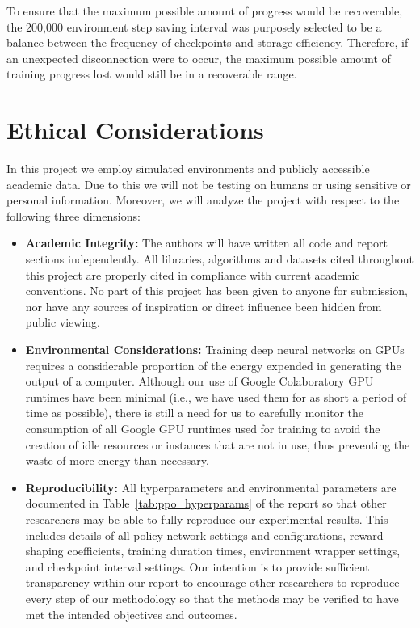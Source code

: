 To ensure that the maximum possible amount of progress would be recoverable, the 200,000 environment step saving interval was purposely selected to be a balance between the frequency of checkpoints and storage efficiency. Therefore, if an unexpected disconnection were to occur, the maximum possible amount of training progress lost would still be in a recoverable range.

\section{Ethical Considerations}
\label{sec:ethics}

In this project we employ simulated environments and publicly accessible academic data. Due to this we will not be testing on humans or using sensitive or personal information. Moreover, we will analyze the project with respect to the following three dimensions:

\begin{itemize}
    \item \textbf{Academic Integrity:} The authors will have written all code and report sections independently. All libraries, algorithms and datasets cited throughout this project are properly cited in compliance with current academic conventions. No part of this project has been given to anyone for submission, nor have any sources of inspiration or direct influence been hidden from public viewing.

    \item \textbf{Environmental Considerations:} Training deep neural networks on GPUs requires a considerable proportion of the energy expended in generating the output of a computer. Although our use of Google Colaboratory GPU runtimes have been minimal (i.e., we have used them for as short a period of time as possible), there is still a need for us to carefully monitor the consumption of all Google GPU runtimes used for training to avoid the creation of idle resources or instances that are not in use, thus preventing the waste of more energy than necessary.

    \item \textbf{Reproducibility:} All hyperparameters and environmental parameters are documented in Table~\ref{tab:ppo_hyperparams} of the report so that other researchers may be able to fully reproduce our experimental results. This includes details of all policy network settings and configurations, reward shaping coefficients, training duration times, environment wrapper settings, and checkpoint interval settings. Our intention is to provide sufficient transparency within our report to encourage other researchers to reproduce every step of our methodology so that the methods may be verified to have met the intended objectives and outcomes.
\end{itemize}

